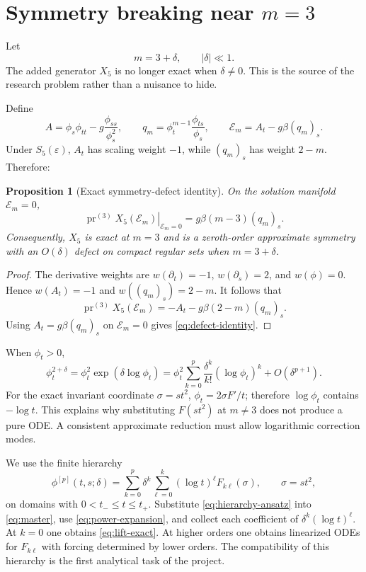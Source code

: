 \documentclass[11pt]{article}
\newcommand{\E}{\mathcal E}
\newcommand{\pr}{\operatorname{pr}}
\newcommand{\eps}{\varepsilon}
\newtheorem{proposition}[definition]{Proposition}
\begin{document}
\section{Symmetry breaking near \texorpdfstring{$m=3$}{m=3}}

Let
\begin{equation}
 m=3+\delta,
 \qquad |\delta|\ll1.
 \label{eq:delta}
\end{equation}
The added generator $X_5$ is no longer exact when $\delta\ne0$.  This is the source of the research problem rather than a nuisance to hide.

Define
\begin{equation}
 A=\phi_s\phi_{tt}-g\frac{\phi_{ss}}{\phi_s^2},
 \qquad
 q_m=\phi_t^{m-1}\frac{\phi_{ts}}{\phi_s},
 \qquad \E_m=A_t-g\beta(q_m)_s.
\end{equation}
Under $S_5(\eps)$, $A_t$ has scaling weight $-1$, while $(q_m)_s$ has weight $2-m$.  Therefore:

\begin{proposition}[Exact symmetry-defect identity]
On the solution manifold $\E_m=0$,
\begin{equation}
 \left.\pr^{(3)}X_5(\E_m)\right|_{\E_m=0}
 =g\beta(m-3)(q_m)_s.
 \label{eq:defect-identity}
\end{equation}
Consequently, $X_5$ is exact at $m=3$ and is a zeroth-order approximate symmetry with an $O(\delta)$ defect on compact regular sets when $m=3+\delta$.
\end{proposition}

\begin{proof}
The derivative weights are $w(\partial_t)=-1$, $w(\partial_s)=2$, and $w(\phi)=0$.  Hence $w(A_t)=-1$ and $w((q_m)_s)=2-m$.  It follows that
\[
 \pr^{(3)}X_5(\E_m)=-A_t-g\beta(2-m)(q_m)_s.
\]
Using $A_t=g\beta(q_m)_s$ on $\E_m=0$ gives \cref{eq:defect-identity}.
\end{proof}

When $\phi_t>0$,
\begin{equation}
 \phi_t^{2+\delta}
 =\phi_t^2\exp(\delta\log\phi_t)
 =\phi_t^2\sum_{k=0}^{p}\frac{\delta^k}{k!}(\log\phi_t)^k
 +O(\delta^{p+1}).
 \label{eq:power-expansion}
\end{equation}
For the exact invariant coordinate $\sigma=st^2$, $\phi_t=2\sigma F'/t$; therefore $\log\phi_t$ contains $-\log t$.  This explains why substituting $F(st^2)$ at $m\ne3$ does not produce a pure ODE.  A consistent approximate reduction must allow logarithmic correction modes.

We use the finite hierarchy
\begin{equation}
 \phi^{[p]}(t,s;\delta)
 =\sum_{k=0}^{p}\delta^k
   \sum_{\ell=0}^{k}(\log t)^\ell F_{k\ell}(\sigma),
 \qquad \sigma=st^2,
 \label{eq:hierarchy-ansatz}
\end{equation}
on domains with $0<t_-\le t\le t_+$.  Substitute \cref{eq:hierarchy-ansatz} into \cref{eq:master}, use \cref{eq:power-expansion}, and collect each coefficient of $\delta^k(\log t)^\ell$.  At $k=0$ one obtains \cref{eq:lift-exact}.  At higher orders one obtains linearized ODEs for $F_{k\ell}$ with forcing determined by lower orders.  The compatibility of this hierarchy is the first analytical task of the project.
\end{document}
